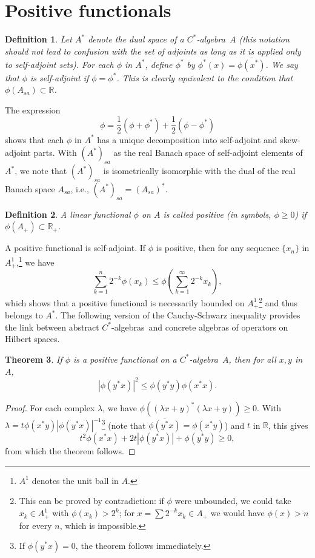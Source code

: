 \documentclass{book}
\newtheorem{definition}{Definition}[section]
\newtheorem{theorem}[definition]{Theorem}
\def\cstar{\(C^*\)-algebra}
\def\cstars{\(C^*\)-algebras}
\begin{document}
\section{Positive functionals}
\begin{definition}
  Let \(A^*\) denote the dual space of a \cstar\ \(A\) (this notation should not lead 
  to confusion with the set of adjoints as long as it is applied only to self-adjoint sets).
  For each \(\phi\) in \(A^*\), define \(\phi^*\) by \(\phi^*(x)=\overline{\phi(x^*)}\).
  We say that \(\phi\) is \textnormal{self-adjoint} if \(\phi=\phi^*\). This is clearly equivalent
  to the condition that \(\phi(A_{sa})\subset\mathbb{R}\).
\end{definition}
The expression 
\[
  \phi=\frac{1}{2}(\phi+\phi^*)+\frac{1}{2}(\phi-\phi^*)
\]
shows that each \(\phi\) in \(A^*\) has a unique decomposition into self-adjoint and skew-adjoint parts.
With \((A^*)_{sa}\) as the real Banach space of self-adjoint elements of \(A^*\), we note that
\((A^*)_{sa}\) is isometrically isomorphic with the dual of the real Banach space \(A_{sa}\), i.e., \((A^*)_{sa}=(A_{sa})^*\).
\begin{definition}
  A linear functional \(\phi\) on \(A\) is called \textnormal{positive} (in symbols, \(\phi\geq0\))
  if \(\phi(A_+)\subset\mathbb{R}_+\).
\end{definition}
A positive functional is self-adjoint. If \(\phi\) is positive, then for any sequence \(\{x_n\}\) in \(A_+^1\),\footnote{\(A^1\) denotes the unit ball in \(A\).} we have
\[
  \sum_{k=1}^n 2^{-k}\phi(x_k)\leq\phi\left(\sum_{k=1}^\infty 2^{-k}x_k\right),
\]
which shows that a positive functional is necessarily bounded on \(A_+^1\)\footnote{This can be proved by contradiction: if \(\phi\) were unbounded, we could take \(x_k\in A_+^1\) with \(\phi(x_k)>2^k\); for \(x=\sum 2^{-k}x_k\in A_+\) we would have \(\phi(x)>n\) for every \(n\), which is impossible.} and thus belongs to \(A^*\).
The following version of the Cauchy-Schwarz inequality provides the link between abstract \cstars\ 
and concrete algebras of operators on Hilbert spaces.
\begin{theorem}\label{Petersen:313}
  If \(\phi\) is a positive functional on a \cstar\ \(A\), then for all \(x,y\) in \(A\),
  \[
    |\phi(y^* x)|^2\leq \phi(y^* y)\phi(x^* x).
  \]
\end{theorem}
\begin{proof}
  For each complex \(\lambda\), we have \(\phi((\lambda x+y)^*(\lambda x+y))\geq 0\).
  With \(\lambda=t\phi(x^* y)|\phi(y^* x)|^{-1}\)\footnote{If \(\phi(y^*x)=0\), the theorem follows immediately.} (note that \(\overline{\phi(y^* x)}=\phi(x^* y)\)) and \(t\) in \(\mathbb{R}\), this gives
  \[
    t^2\phi(x^* x)+2t|\phi(y^* x)|+\phi(y^* y)\geq 0,
  \]
  from which the theorem follows.
\end{proof}
\end{document}
